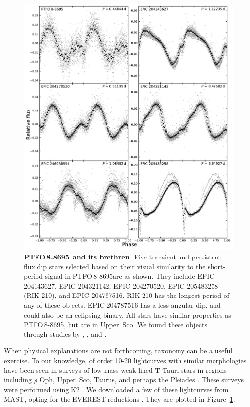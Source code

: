 \documentclass[12pt,twocolumn,tighten]{aastex62}
\newcommand{\ptfo}{PTFO$\,$8-8695}
\begin{document}
\begin{figure}[hbtp]
	\begin{center}
		\leavevmode
		\includegraphics[width=1\textwidth]{f7.pdf}
	\end{center}
	\vspace{-0.7cm}
  \caption{ {\bf \ptfo\ and its brethren.}
    Five transient and persistent flux dip stars selected based on
    their visual similarity to the short-period signal in \ptfo are as
    shown.  They include EPIC 204143627, EPIC 204321142, EPIC
    204270520, EPIC 205483258 (RIK-210), and EPIC 204787516.  RIK-210
    has the longest period of any of these objects.  EPIC 204787516
    has a less angular dip, and could also be an eclipsing binary.
    All stars have similar properties as \ptfo, but are in Upper~Sco.
    We found these objects through studies by
    \citet{stauffer_orbiting_2017}, \citet{david_transient_2017}, and
    \citet{rebull_usco_2018}.
		\label{fig:brethren}
	}
\end{figure}

When physical explanations are not forthcoming, taxonomy can be a
useful exercise.  To our knowledge, of order 10-20 lightcurves with
similar morphologies have been seen in surveys of low-mass weak-lined
T Tauri stars in regions including $\rho$ Oph, Upper~Sco, Taurus, and
perhaps the Pleiades
\citep{rebull_rotation_2016,david_transient_2017,stauffer_orbiting_2017,stauffer_rotevol_2018,rebull_usco_2018,rebull_rotation_2020}.
These surveys were performed using K2 \citep{howell_k2_2014}.  We
downloaded a few of these lightcurves from MAST, opting for the
EVEREST reductions \citep{luger_everest_2016,luger_update_2018}.  They
are plotted in Figure~\ref{fig:brethren}.
\end{document}
